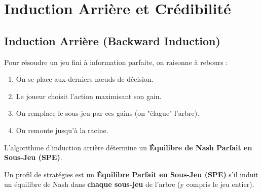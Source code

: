 \section{Induction Arrière et Crédibilité}

\subsection{Induction Arrière (Backward Induction)}
Pour résoudre un jeu fini à information parfaite, on raisonne à rebours :
\begin{enumerate}
    \item On se place aux derniers nœuds de décision.
    \item Le joueur choisit l'action maximisant son gain.
    \item On remplace le sous-jeu par ces gains (on "élague" l'arbre).
    \item On remonte jusqu'à la racine.
\end{enumerate}

\begin{theoreme}
L'algorithme d'induction arrière détermine un \textbf{Équilibre de Nash Parfait en Sous-Jeu (SPE)}.
\end{theoreme}

\begin{definition}
Un profil de stratégies est un \textbf{Équilibre Parfait en Sous-Jeu (SPE)} s'il induit un équilibre de Nash dans \textbf{chaque sous-jeu} de l'arbre (y compris le jeu entier).
\end{definition}

